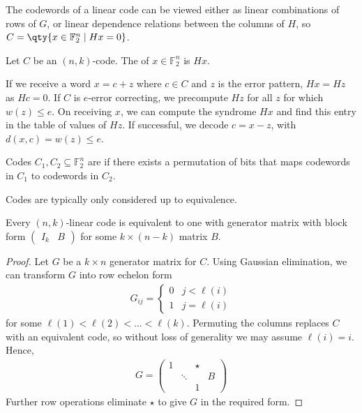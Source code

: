 The codewords of a linear code can be viewed either as linear combinations of rows of $G$, or linear dependence relations between the columns of $H$, so $C = \qty{x \in \mathbb F_2^n \mid H x = 0}$.
\begin{definition}
    Let $C$ be an $(n, k)$-code.
    The  of $x \in \mathbb F_2^n$ is $Hx$.
\end{definition}
If we receive a word $x = c + z$ where $c \in C$ and $z$ is the error pattern, $Hx = Hz$ as $Hc = 0$.
If $C$ is $e$-error correcting, we precompute $Hz$ for all $z$ for which $w(z) \leq e$.
On receiving $x$, we can compute the syndrome $Hx$ and find this entry in the table of values of $Hz$.
If successful, we decode $c = x - z$, with $d(x,c) = w(z) \leq e$.
\begin{definition}
    Codes $C_1, C_2 \subseteq \mathbb F_2^n$ are  if there exists a permutation of bits that maps codewords in $C_1$ to codewords in $C_2$.
\end{definition}
Codes are typically only considered up to equivalence.
\begin{lemma}
    Every $(n, k)$-linear code is equivalent to one with generator matrix with block form $\begin{pmatrix}
        I_k & B
    \end{pmatrix}$ for some $k \times (n - k)$ matrix $B$.
\end{lemma}
\begin{proof}
    Let $G$ be a $k \times n$ generator matrix for $C$.
    Using Gaussian elimination, we can transform $G$ into row echelon form
    \begin{align*}
        G_{ij} = \begin{cases}
            0 & j < \ell(i) \\
            1 & j = \ell(i)
        \end{cases}
    \end{align*}
    for some $\ell(1) < \ell(2) < \dots < \ell(k)$.
    Permuting the columns replaces $C$ with an equivalent code, so without loss of generality we may assume $\ell(i) = i$.
    Hence,
    \begin{align*}
        G = \begin{pmatrix}
            1 & & \star \\
            & \ddots & & B \\
            & & 1
        \end{pmatrix}
    \end{align*}
    Further row operations eliminate $\star$ to give $G$ in the required form.
\end{proof}
